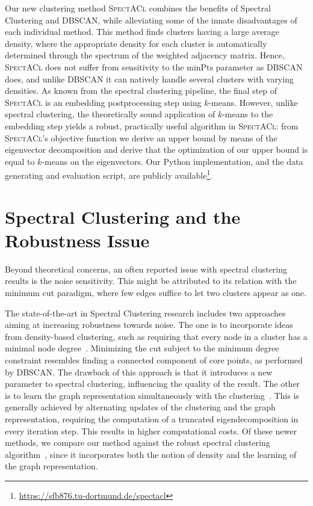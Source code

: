 Our new clustering method \textsc{SpectACl} combines the benefits of Spectral Clustering and DBSCAN, while alleviating some of the innate disadvantages of each individual method.  
This method finds clusters having a large average density, where the appropriate density for each cluster is automatically determined through the spectrum of the weighted adjacency matrix.
Hence, \textsc{SpectACl} does not suffer
from sensitivity to the $\text{minPts}$ parameter as DBSCAN does, and unlike DBSCAN it can natively handle several clusters with varying densities.  As known from the spectral clustering pipeline, the final step of \textsc{SpectACl} is an embedding postprocessing step using $k$-means. However, unlike spectral clustering, the theoretically sound application of $k$-means to the embedding step yields a robust, practically useful algorithm in \textsc{SpectACl}: from \textsc{SpectACl}'s objective function we derive an upper bound by means of the eigenvector decomposition and derive that the optimization of our upper bound is equal to $k$-means on the eigenvectors.  Our Python implementation, and the data generating and evaluation script, are publicly available\footnote{\url{https://sfb876.tu-dortmund.de/spectacl}}.

\section{Spectral Clustering and the Robustness Issue}
Beyond theoretical concerns, an often reported issue with spectral clustering results is the noise sensitivity. This might be attributed to its relation with the minimum cut paradigm, where few edges suffice to let two clusters appear as one.   

The state-of-the-art in Spectral Clustering research includes two approaches aiming at increasing robustness towards noise. The one is to incorporate ideas from density-based clustering, such as requiring that every node in a cluster has a minimal node degree~\cite{bojchevski2017robust}. Minimizing the cut subject to the minimum degree constraint resembles finding a connected component of core points, as performed by DBSCAN. The drawback of this approach is that it introduces a new parameter to spectral clustering, influencing the quality of the result.  
The other is to learn the graph representation simultaneously with the clustering~\cite{bojchevski2017robust,kang2018unified,nie2017learning}. This is generally achieved by alternating updates of the clustering and the graph representation, requiring the computation of a truncated eigendecomposition in every iteration step. This results in higher computational costs.
Of these newer methods, we compare our method against the robust spectral clustering algorithm~\cite{bojchevski2017robust}, since it incorporates both the notion of density and the learning of the graph representation.

